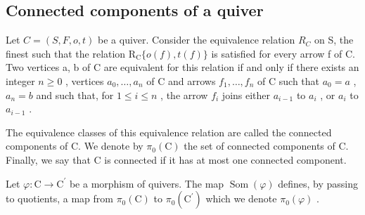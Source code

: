\subsection{Connected components of a quiver}

Let \(C = (S, F, o, t)\) be a quiver. Consider the equivalence relation \(R_{C}\) on S, the finest such that the relation \(\mathrm{R}_{\mathrm{C}}\{o(f), t(f)\}\) is satisfied for every arrow f of C. Two vertices a, b of C are equivalent for this relation if and only if there exists an integer \(n \geqslant 0\) , vertices \(a_{0}, \ldots, a_{n}\) of C and arrows \(f_{1}, \ldots, f_{n}\) of C such that \(a_{0} = a\) , \(a_{n} = b\) and such that, for \(1 \leqslant i \leqslant n\) , the arrow \(f_{i}\) joins either \(a_{i-1}\) to \(a_{i}\) , or \(a_{i}\) to \(a_{i-1}\) .

The equivalence classes of this equivalence relation are called the connected components of C. We denote by \(\pi_0(\mathrm{C})\) the set of connected components of C. Finally, we say that C is connected if it has at most one connected component.

Let \(\varphi\colon\mathrm{C}\to\mathrm{C}^{\prime}\) be a morphism of quivers. The map \(\operatorname{Som}(\varphi)\) defines, by passing to quotients, a map from \(\pi_{0}(\mathrm{C})\) to \(\pi_{0}(\mathrm{C}^{\prime})\) which we denote \(\pi_{0}(\varphi)\) .

